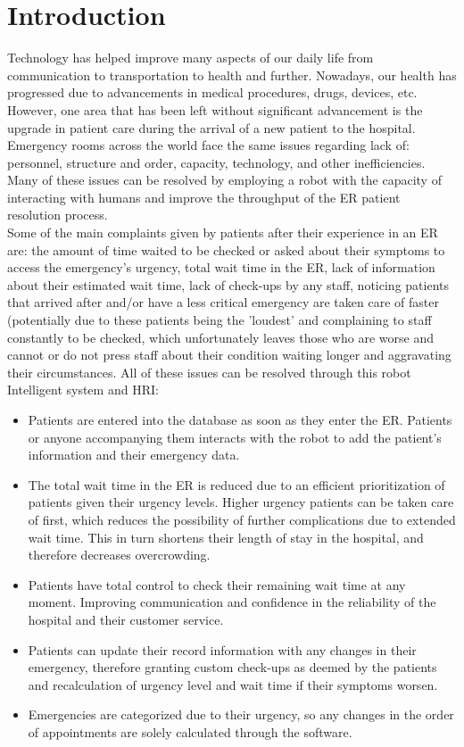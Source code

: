 \documentclass[letterpaper]{article}
\begin{document}
\section{Introduction}
\noindent 
Technology has helped improve many aspects of our daily life from communication to transportation to health and further. Nowadays, our health has progressed due to advancements in medical procedures, drugs, devices, etc. However, one area that has been left without significant advancement is the upgrade in patient care during the arrival of a new patient to the hospital. Emergency rooms across the world face the same issues regarding lack of: personnel, structure and order, capacity, technology, and other inefficiencies. Many of these issues can be resolved by employing a robot with the capacity of interacting with humans and improve the throughput of the ER patient resolution process.\\

Some of the main complaints given by patients after their experience in an ER are: the amount of time waited to be checked or asked about their symptoms to access the emergency's urgency, total wait time in the ER, lack of information about their estimated wait time, lack of check-ups by any staff, noticing patients that arrived after and/or have a less critical emergency are taken care of faster (potentially due to these patients being the 'loudest' and complaining to staff constantly to be checked, which unfortunately leaves those who are worse and cannot or do not press staff about their condition waiting longer and aggravating their circumstances. All of these issues can be resolved through this robot Intelligent system and HRI:   

\begin{itemize}
\item Patients are entered into the database as soon as they enter the ER. Patients or anyone accompanying them interacts with the robot to add the patient's information and their emergency data.
\item The total wait time in the ER is reduced due to an efficient prioritization of patients given their urgency levels. Higher urgency patients can be taken care of first, which reduces the possibility of further complications due to extended wait time. This in turn shortens their length of stay in the hospital, and therefore decreases overcrowding.
\item Patients have total control to check their remaining wait time at any moment. Improving communication and confidence in the reliability of the hospital and their customer service.
\item Patients can update their record information with any changes in their emergency, therefore granting custom check-ups as deemed by the patients and recalculation of urgency level and wait time if their symptoms worsen. 
\item Emergencies are categorized due to their urgency, so any changes in the order of appointments are solely calculated through the software. 
\end{itemize}
\end{document}
